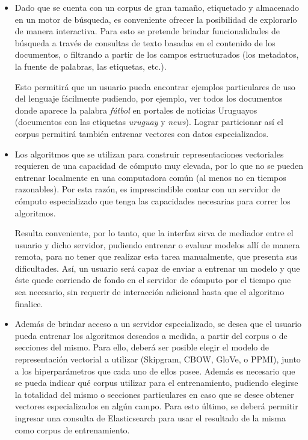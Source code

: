 \begin{itemize}

\item Dado que se cuenta con un corpus de gran tamaño, etiquetado y almacenado en un motor de
búsqueda, es conveniente ofrecer la posibilidad de explorarlo de manera interactiva. Para esto se
pretende brindar funcionalidades de búsqueda a través de consultas de texto basadas en el contenido
de los documentos, o filtrando a partir de los campos estructurados (los metadatos, la fuente de
palabras, las etiquetas, etc.).

Esto permitirá que un usuario pueda encontrar ejemplos particulares de uso del lenguaje fácilmente
pudiendo, por ejemplo, ver todos los documentos donde aparece la palabra \textit{fútbol} en portales
de noticias Uruguayos (documentos con las etiquetas \textit{uruguay} y \textit{news}). Lograr
particionar así el corpus permitirá también entrenar vectores con datos especializados.

\item Los algoritmos que se utilizan para construir representaciones vectoriales requieren de una
capacidad de cómputo muy elevada, por lo que no se pueden entrenar localmente en una computadora
común (al menos no en tiempos razonables). Por esta razón, es imprescindible contar con un servidor
de cómputo especializado que tenga las capacidades necesarias para correr los algoritmos.

Resulta conveniente, por lo tanto, que la interfaz sirva de mediador entre el usuario y dicho
servidor, pudiendo entrenar o evaluar modelos allí de manera remota, para no tener que realizar esta
tarea manualmente, que presenta sus dificultades. Así, un usuario será capaz de enviar a entrenar un
modelo y que éste quede corriendo de fondo en el servidor de cómputo por el tiempo que sea
necesario, sin requerir de interacción adicional hasta que el algoritmo finalice.

\item Además de brindar acceso a un servidor especializado, se desea que el usuario pueda entrenar
los algoritmos deseados a medida, a partir del corpus o de secciones del mismo. Para ello, deberá
ser posible elegir el modelo de representación vectorial a utilizar (Skipgram, CBOW, GloVe, o PPMI),
junto a los hiperparámetros que cada uno de ellos posee. Además es necesario que se pueda indicar
qué corpus utilizar para el entrenamiento, pudiendo elegirse la totalidad del mismo o secciones
particulares en caso que se desee obtener vectores especializados en algún campo. Para esto último,
se deberá permitir ingresar una consulta de Elasticsearch para usar el resultado de la misma como
corpus de entrenamiento.


\end{itemize}
